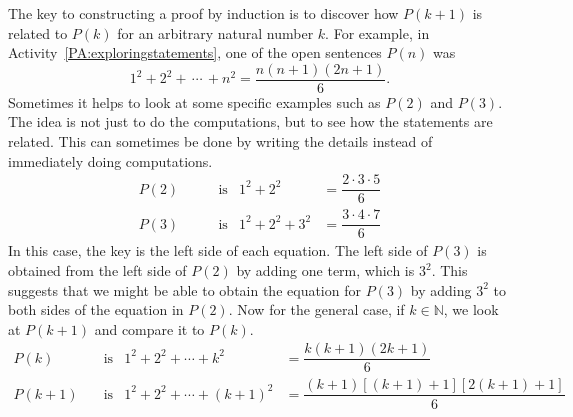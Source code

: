 The key to constructing a proof by induction is to discover how  $P( {k + 1} )$
 is related to  $P( k )$ for an arbitrary natural number  $k$.  For example, in 
\typeu Activity~\ref*{PA:exploringstatements}, one of the open sentences $P(n)$ was
\[
1^2  + 2^2  + \, \cdots \, + n^2  = \frac{{n(n + 1)(2n + 1)}}{6}.
\]
Sometimes it helps to look at some specific examples such as  $P( 2 )$ and  $P( 3 )$.  The idea is not just to do the computations, but to see how the statements are related.  This can sometimes be done by writing the details instead of immediately doing computations.
\begin{align*}
P(2) &\qquad \text{is} & 1^2  + 2^2  &= \dfrac{{2 \cdot 3 \cdot 5}}{6} \\
P(3) &\qquad \text{is} & 1^2  + 2^2  + 3^2  &= \dfrac{{3 \cdot 4 \cdot 7}}{6}
\end{align*}
In this case, the key is the left side of each equation.  The left side of  $P( 3 )$
  is obtained from the left side of  $P( 2 )$  by adding one term, which is $3^2$.  This suggests that we might be able to obtain the equation for $P( 3 )$  by adding  
$3^2$  to both sides of  the equation in  $P( 2 )$.  Now for the general case, if  
$k \in \mathbb{N}$, we look at  $P( {k + 1})$ and compare it to  $P( k )$.
\begin{align*}
P(k)  &\quad \text{is} & 1^2  + 2^2  +  \cdots  + k^2  &= \dfrac{{k(k + 1)(2k + 1)}}{6} \\
P(k+1)  &\quad \text{is} & 1^2  + 2^2  +  \cdots  + \left( {k + 1} \right)^2  &= \dfrac{{\left( {k + 1} \right)\left[ {\left( {k + 1} \right) + 1} \right]\left[ {2\left( {k + 1} \right) + 1} \right]}}{6}
\end{align*}



